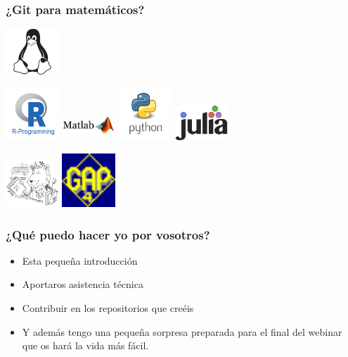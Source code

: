 \begin{frame}\frametitle{¿Git para matemáticos?}
\begin{center}
\pause
\includegraphics[width=2cm]{images/linux-logo.jpg}

\pause
\includegraphics[width=2cm]{images/r-logo.jpg}
\includegraphics[width=2cm]{images/matlab-logo.jpg}
\includegraphics[width=2cm]{images/python-logo.jpg}
\includegraphics[width=2cm]{images/julia-logo.png}

\pause
\includegraphics[width=2cm]{images/ctan-logo.png}
\includegraphics[width=2cm]{images/gap-logo.png}
\end{center}
\end{frame}

\begin{frame}\frametitle{¿Qué puedo hacer yo por vosotros?}
\begin{itemize}
    \item Esta pequeña introducción

    \item Aportaros asistencia técnica

    \item Contribuir en los repositorios que creéis

\pause
\vfill

    \item Y además tengo una pequeña sorpresa preparada para el final del webinar
    que os hará la vida más fácil.
\end{itemize}
\end{frame}

